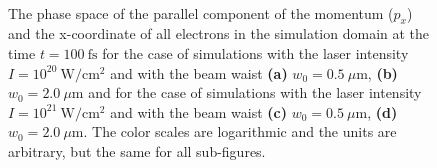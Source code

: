 \begin{figure}[h!]
	\centering
	\\
	\caption{The phase space of the parallel component of the momentum ($ p_x $) and the x-coordinate of all electrons in the simulation domain at the time $ t = 100 \ \mathrm{fs} $ for the case of simulations with the laser intensity $ I = 10^{20} \ \mathrm{W/cm^2} $ and with the beam waist \textbf{(a)} $ w_0 = 0.5 \ \mu\mathrm{m} $, \textbf{(b)} $ w_0 = 2.0 \ \mu\mathrm{m} $ and for the case of simulations with the laser intensity $ I = 10^{21} \ \mathrm{W/cm^2} $ and with the beam waist \textbf{(c)} $ w_0 = 0.5 \ \mu\mathrm{m} $, \textbf{(d)} $ w_0 = 2.0 \ \mu\mathrm{m} $. The color scales are logarithmic and the units are arbitrary, but the same for all sub-figures.}
	\label{fig:11}
\end{figure}

